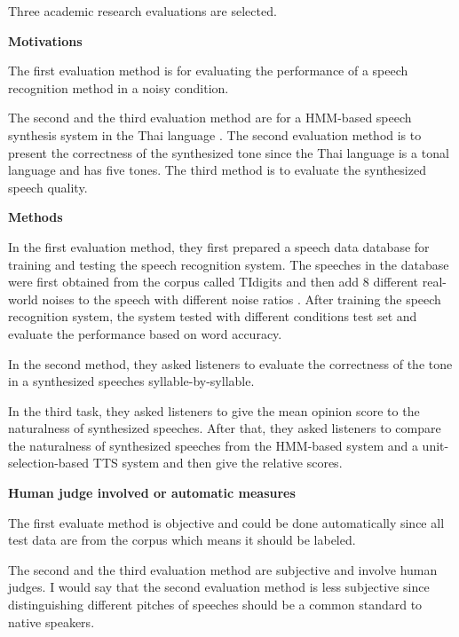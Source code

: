 \documentclass[12pt]{article}
\newenvironment{problem}[2][Problem]{\begin{trivlist}
\item[\hskip \labelsep {\bfseries #1}\hskip \labelsep {\bfseries #2.}]}{\end{trivlist}}
\begin{document}
\begin{problem}{5.3}
    Three academic research evaluations are selected. 
    
\noindent\textbf{Motivations}

    The first evaluation method is for evaluating the performance of a speech 
    recognition method in a noisy condition. \cite{hirsch2000aurora}
    
    The second and the third evaluation method are for a HMM-based speech 
    synthesis system in the Thai language \cite{chomphan2007implementation}.    
    The second evaluation method is to present the correctness of the synthesized 
    tone since the Thai language is a tonal language and has five tones.
    The third method is to evaluate the synthesized speech quality.

\noindent\textbf{Methods}

    In the first evaluation method, they first prepared a speech data database 
    for training and testing the speech recognition system. 
    The speeches in the database were first obtained from the corpus called 
    TIdigits and then add 8 different real-world noises to the speech with 
    different noise ratios \cite{hirsch2000aurora}.
    After training the speech recognition system, the system tested with different
    conditions test set and evaluate the performance based on word accuracy.

    In the second method, they asked listeners to evaluate the correctness of the 
    tone in a synthesized speeches syllable-by-syllable. \cite{tone_questions} 
    
    In the third task, they asked listeners to give the mean opinion score to 
    the naturalness of synthesized speeches. After that, they asked listeners
    to compare the naturalness of synthesized speeches from the HMM-based system and 
    a unit-selection-based TTS system and then give the relative scores.

\noindent\textbf{Human judge involved or automatic measures}
    
    The first evaluate method is objective and could be done automatically since
    all test data are from the corpus which means it should be labeled.

    The second and the third evaluation method are subjective and involve human judges.
    I would say that the second evaluation method is less subjective since 
    distinguishing different pitches of speeches should be a common standard to
    native speakers.


\end{problem}
\end{document}
